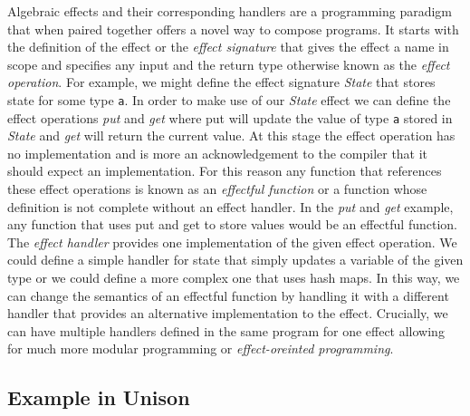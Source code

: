 \documentclass[logo,bsc,singlespacing,parskip]{infthesis}
\begin{document}
Algebraic effects \cite{plotkin2002computational} and their corresponding
handlers \cite{plotkin2009handlers} \cite{pretnar2015introduction} are a
programming paradigm that when paired together offers a novel way to compose
programs. It starts with the definition of the effect or the \emph{effect
signature} that gives the effect a name in scope and specifies any input and the
return type otherwise known as the \emph{effect operation}.  For example, we
might define the effect signature \emph{State} that stores state for some type
\texttt{a}. In order to make use of our \emph{State} effect we can define the
effect operations \emph{put} and \emph{get} where put will update the value of
type \texttt{a} stored in \emph{State} and \emph{get} will return the current value.  At this
stage the effect operation has no implementation and is more an acknowledgement
to the compiler that it should expect an implementation. For this reason any
function that references these effect operations is known as an \emph{effectful
function} or a function whose definition is not complete without an effect
handler. In the \emph{put} and \emph{get} example, any function that uses put and get to store
values would be an effectful function. The \emph{effect handler} provides one
implementation of the given effect operation. We could define a simple handler
for state that simply updates a variable of the given type or we could define a
more complex one that uses hash maps.  In this way, we can change the semantics
of an effectful function by handling it with a different handler that provides
an alternative implementation to the effect. Crucially, we can have multiple
handlers defined in the same program for one effect allowing for much more
modular programming or \emph{effect-oreinted programming}.


\subsection{Example in Unison}
\label{subsection:unison}
\end{document}
